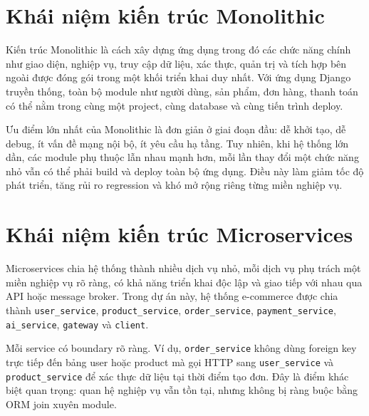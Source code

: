 \documentclass[12pt,a4paper]{report}
\begin{document}
\section{Khái niệm kiến trúc Monolithic}
Kiến trúc Monolithic là cách xây dựng ứng dụng trong đó các chức năng chính như giao diện, nghiệp vụ, truy cập dữ liệu, xác thực, quản trị và tích hợp bên ngoài được đóng gói trong một khối triển khai duy nhất. Với ứng dụng Django truyền thống, toàn bộ module như người dùng, sản phẩm, đơn hàng, thanh toán có thể nằm trong cùng một project, cùng database và cùng tiến trình deploy.

Ưu điểm lớn nhất của Monolithic là đơn giản ở giai đoạn đầu: dễ khởi tạo, dễ debug, ít vấn đề mạng nội bộ, ít yêu cầu hạ tầng. Tuy nhiên, khi hệ thống lớn dần, các module phụ thuộc lẫn nhau mạnh hơn, mỗi lần thay đổi một chức năng nhỏ vẫn có thể phải build và deploy toàn bộ ứng dụng. Điều này làm giảm tốc độ phát triển, tăng rủi ro regression và khó mở rộng riêng từng miền nghiệp vụ.

\section{Khái niệm kiến trúc Microservices}
Microservices chia hệ thống thành nhiều dịch vụ nhỏ, mỗi dịch vụ phụ trách một miền nghiệp vụ rõ ràng, có khả năng triển khai độc lập và giao tiếp với nhau qua API hoặc message broker. Trong dự án này, hệ thống e-commerce được chia thành \texttt{user\_service}, \texttt{product\_service}, \texttt{order\_service}, \texttt{payment\_service}, \texttt{ai\_service}, \texttt{gateway} và \texttt{client}.

Mỗi service có boundary rõ ràng. Ví dụ, \texttt{order\_service} không dùng foreign key trực tiếp đến bảng user hoặc product mà gọi HTTP sang \texttt{user\_service} và \texttt{product\_service} để xác thực dữ liệu tại thời điểm tạo đơn. Đây là điểm khác biệt quan trọng: quan hệ nghiệp vụ vẫn tồn tại, nhưng không bị ràng buộc bằng ORM join xuyên module.
\end{document}
